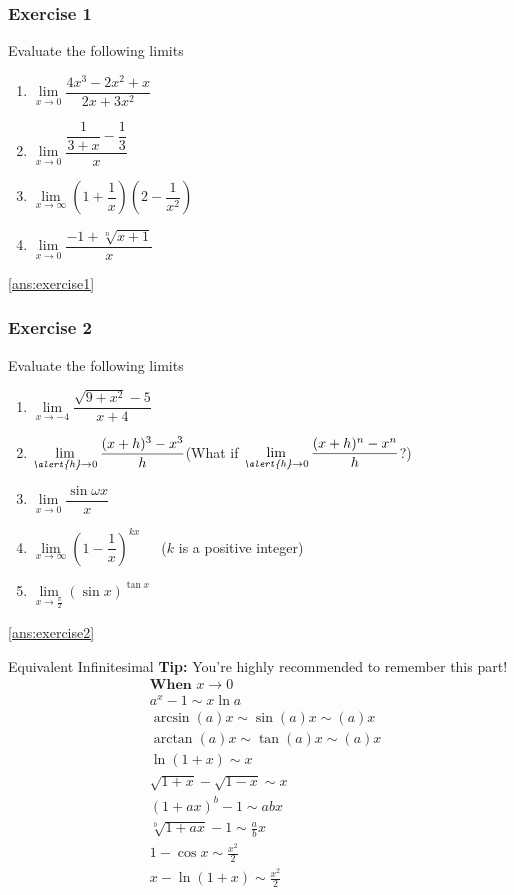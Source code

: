 
\begin{frame}
	\frametitle{Exercise 1}
	Evaluate the following limits\\
	\begin{enumerate}
		\item $\lim\limits_{\textit{x} \to 0}\dfrac{4x^{3}-2x^{2}+x}{2x+3x^{2}}$
		\item $\lim\limits_{\textit{x} \to 0}\dfrac{\dfrac{1}{3+x}-\dfrac{1}{3}}{x}$
		\item $\lim\limits_{\textit{x} \to \infty}(1+\dfrac{1}{x})(2-\dfrac{1}{x^{2}})$
		\item $\lim\limits_{\textit{x} \to 0}\dfrac{-1+\sqrt[n]{x+1}}{x}$
	\end{enumerate}
	\vspace*{1em}
	\ref{ans:exercise1}
\end{frame}
\begin{frame}
	\frametitle{Exercise 2}
	Evaluate the following limits\\
	\begin{enumerate}
		\item $\lim\limits_{\textit{x} \to -4}\dfrac{\sqrt{9+x^{2}}-5}{x+4}$
		\item $\lim\limits_{\textit{\alert{h}} \to 0}\dfrac{(x+h)^{3}-x^{3}}{h}$(What if $\lim\limits_{\textit{\alert{h}} \to 0}\dfrac{(x+h)^{n}-x^{n}}{h}$?)
		\item $\lim\limits_{\textit{x} \to 0}\dfrac{\sin{\omega x}}{x}$
		\item $\lim\limits_{\textit{x} \to \infty}(1-\dfrac{1}{x})^{kx}$\ \ \ ($k$ is a positive integer)
		\item $\lim\limits_{\textit{x} \to \frac{\pi}{2}}(\sin{x})^{\tan{x}}$
	\end{enumerate}
	\vspace*{1em}
	\ref{ans:exercise2}
\end{frame}


\begin{frame}{Equivalent Infinitesimal}
	\textbf{Tip:} You're highly recommended to remember this part!
	$$
		\begin{aligned}
			 & \textbf{When } x \rightarrow 0          \\
			 & a^{x}-1 \sim x \ln a                    \\
			 & \arcsin (a) x \sim \sin (a) x \sim(a) x \\
			 & \arctan (a) x \sim \tan (a) x \sim(a) x \\
			 & \ln (1+x) \sim x                        \\
			 & \sqrt{1+x}-\sqrt{1-x} \sim x            \\
			 & (1+a x)^{b}-1 \sim a b x                \\
			 & \sqrt[b]{1+a x}-1 \sim \frac{a}{b} x    \\
			 & 1-\cos x \sim \frac{x^{2}}{2}           \\
			 & x-\ln (1+x) \sim \frac{x^{2}}{2}        \\
		\end{aligned}
	$$
\end{frame}





